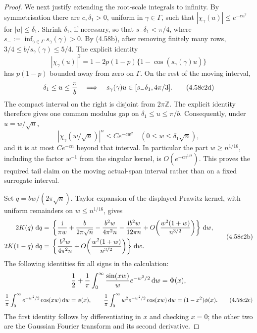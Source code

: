 \documentclass[11pt,a4paper]{article}
\numberwithin{equation}{section}
\theoremstyle{definition}
\theoremstyle{remark}
\newcommand{\ii}{\mathrm i}
\newcommand{\dd}{\,\mathrm d}
\begin{document}
\begin{proof}
We next justify extending the root-scale integrals to infinity.  By
symmetrisation there are \(c,\delta_1>0\), uniform in
\(\gamma\in\Gamma\), such that
\(|\chi_\gamma(u)|\le e^{-cu^2}\) for \(|u|\le\delta_1\).
Shrink \(\delta_1\), if necessary, so that
\(s_-\delta_1<\pi/4\), where
\(s_-:=\inf_{\gamma\in\Gamma}s_\gamma(\gamma)>0\).
By (4.58b), after removing finitely many rows,
\(3/4\le b/s_\gamma(\gamma)\le5/4\).  The explicit identity
\[
 |\chi_\gamma(u)|^2
 =1-2p(1-p)\{1-\cos(s_\gamma(\gamma)u)\}
\]
has \(p(1-p)\) bounded away from zero on \(\Gamma\).  On the rest of
the moving interval,
\[
 \delta_1\le u\le{\pi\over b}
 \quad\Longrightarrow\quad
 s_\gamma(\gamma)u\in[s_-\delta_1,4\pi/3].           \tag{4.58c2d}
\]
The compact interval on the right is disjoint from \(2\pi\mathbb Z\).
The explicit identity therefore gives one common modulus gap on
\(\delta_1\le u\le\pi/b\).  Consequently, under
\(u=w/\sqrt n\),
\[
 |\chi_\gamma(w/\sqrt n)|^n
       \le C e^{-cw^2}\quad(0\le w\le\delta_1\sqrt n),
\]
and it is at most \(C e^{-cn}\) beyond that interval.  In particular the
part \(w\ge n^{1/16}\), including the factor \(w^{-1}\) from the
singular kernel, is \(O(e^{-c n^{1/8}})\).  This proves the required tail
claim on the moving actual-span interval rather than on a fixed
surrogate interval.

Set \(q=bw/(2\pi\sqrt n)\).  Taylor expansion of the displayed Prawitz
kernel, with uniform remainders on \(w\le n^{1/16}\), gives
\[
 \begin{split}
 2K(q)\,\dd q={}&\left\{{\ii\over\pi w}
 +{b\over2\pi\sqrt n}-{b^2w\over4\pi^2n}
 -{\ii b^2w\over12\pi n}
 +O\!\left({w^2(1+w)\over n^{3/2}}\right)\right\}\dd w,\\
 2K(1-q)\,\dd q={}&\left\{{b^2w\over4\pi^2n}
 +O\!\left({w^2(1+w)\over n^{3/2}}\right)\right\}\dd w.
 \end{split}                                           \tag{4.58c2b}
\]
The following identities fix all signs in the calculation:
\[
 {1\over2}+{1\over\pi}\int_0^\infty
       {\sin(xw)\over w}e^{-w^2/2}\dd w=\Phi(x),
\]
\[
 {1\over\pi}\int_0^\infty e^{-w^2/2}\cos(xw)\dd w=\phi(x),
 \qquad
 {1\over\pi}\int_0^\infty w^2e^{-w^2/2}\cos(xw)\dd w
       =(1-x^2)\phi(x).                              \tag{4.58c2c}
\]
The first identity follows by differentiating in \(x\) and checking
\(x=0\); the other two are the Gaussian Fourier transform and its second
derivative.


\end{proof}
\end{document}
